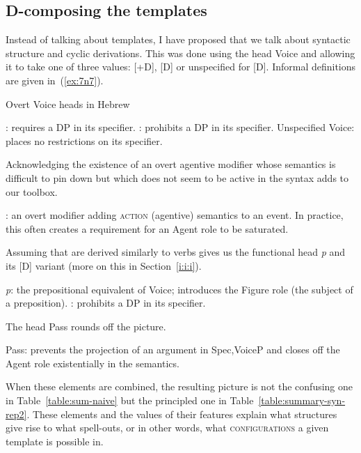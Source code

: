 \begin{exe}
\begin{xlist}
\begin{xlist}
\begin{xlist}
\begin{xlist}
\begin{xlist}
\begin{xlist}
	\subsection{D-composing the templates}
Instead of talking about templates, I have proposed that we talk about syntactic structure and cyclic derivations. This was done using the head Voice and allowing it to take one of three values: [+D], [\textminus{}D] or unspecified for [D]. Informal definitions are given in~(\ref{ex:7n7}).
 \begin{exe}
 \ex  \label{ex:7n7}Overt Voice heads in Hebrew 
 \begin{xlist} 
 \ex  {\vd}: requires a DP in its specifier. 
 \ex  {\vz}: prohibits a DP in its specifier. 
 \ex  Unspecified Voice: places no restrictions on its specifier. 
 \z
\z 

Acknowledging the existence of an overt agentive modifier whose semantics is difficult to pin down but which does not seem to be active in the syntax adds {\va} to our toolbox.

 \begin{exe}
\ex \sloppy {\va}: an overt modifier adding \textsc{action} (agentive) semantics to an event. In practice, this often creates a requirement for an Agent role to be saturated. 
 \z 

Assuming that  are derived similarly to verbs gives us the functional head \textit{p} and its [\textminus{}D] variant {\pz} (more on this in Section~\ref{i:i:i}).
 \begin{exe}
 \ex  
 \begin{xlist} 
 	\ex  \textit{p}: the prepositional equivalent of Voice; introduces the Figure role (the subject of a preposition). 
 	\ex  {\pz}: prohibits a DP in its specifier. 
 \z
\z 

The  head Pass rounds off the picture.
 \begin{exe}
\ex  Pass: prevents the projection of an argument in Spec,VoiceP and closes off the Agent role existentially in the semantics. 
 \z 

When these elements are combined, the resulting picture is not the confusing one in Table~\ref{table:sum-naive} but the principled one in Table~\ref{table:summary-syn-rep2}. These elements and the values of their features explain what structures give rise to what spell-outs, or in other words, what \textsc{configurations} a given template is possible in.

\begin{table}
\end{table}
\end{exe}
\end{xlist}
\end{exe}
\end{exe}
\end{xlist}
\end{exe}
\end{xlist}
\end{xlist}
\end{xlist}
\end{xlist}
\end{xlist}
\end{xlist}
\end{exe}
